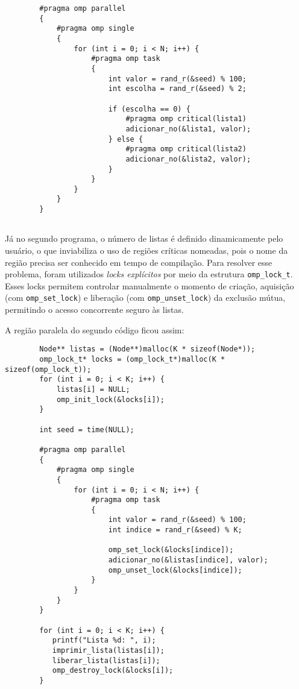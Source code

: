\documentclass[a4paper, 12pt]{article}
\begin{document}
	\begin{verbatim}
	    #pragma omp parallel
	    {
	        #pragma omp single
	        {
	            for (int i = 0; i < N; i++) {
	                #pragma omp task
	                {
	                    int valor = rand_r(&seed) % 100;
	                    int escolha = rand_r(&seed) % 2;
						
	                    if (escolha == 0) {
	                        #pragma omp critical(lista1)
	                        adicionar_no(&lista1, valor);
	                    } else {
	                        #pragma omp critical(lista2)
	                        adicionar_no(&lista2, valor);
	                    }
	                }
	            }
	        }
	    }
		
	\end{verbatim}
	
	Já no segundo programa, o número de listas é definido dinamicamente pelo usuário, o que inviabiliza o uso de regiões críticas nomeadas, pois o nome da região precisa ser conhecido em tempo de compilação. Para resolver esse problema, foram utilizados \textit{locks explícitos} por meio da estrutura \texttt{omp\_lock\_t}. Esses locks permitem controlar manualmente o momento de criação, aquisição (com \texttt{omp\_set\_lock}) e liberação (com \texttt{omp\_unset\_lock}) da exclusão mútua, permitindo o acesso concorrente seguro às listas.

	A região paralela do segundo código ficou assim:
	
	\begin{verbatim}
	    Node** listas = (Node**)malloc(K * sizeof(Node*));
	    omp_lock_t* locks = (omp_lock_t*)malloc(K * sizeof(omp_lock_t));
	    for (int i = 0; i < K; i++) {
	        listas[i] = NULL;
	        omp_init_lock(&locks[i]);
	    }
		
	    int seed = time(NULL);
		
	    #pragma omp parallel
	    {
	        #pragma omp single
	        {
	            for (int i = 0; i < N; i++) {
	                #pragma omp task
	                {
	                    int valor = rand_r(&seed) % 100;
	                    int indice = rand_r(&seed) % K;
						
	                    omp_set_lock(&locks[indice]);
	                    adicionar_no(&listas[indice], valor);
	                    omp_unset_lock(&locks[indice]);
	                }
	            }
	        }
	    }
	    
	    for (int i = 0; i < K; i++) {
           printf("Lista %d: ", i);
           imprimir_lista(listas[i]);
           liberar_lista(listas[i]);
           omp_destroy_lock(&locks[i]);
	    }
	    
	\end{verbatim}
	
\end{document}
